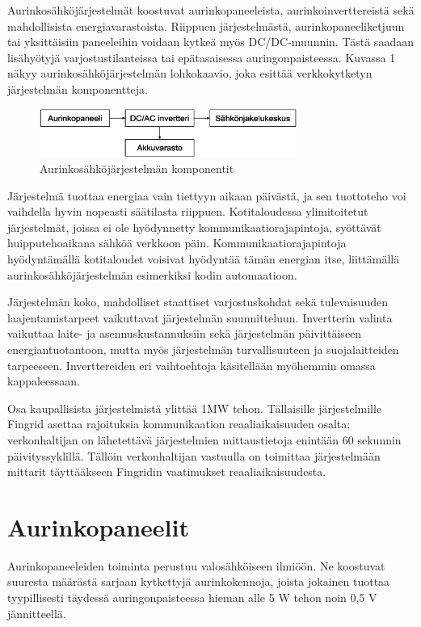 Aurinkosähköjärjestelmät koostuvat aurinkopaneeleista, aurinkoinverttereistä sekä mahdollisista energiavarastoista. Riippuen järjestelmästä, aurinkopaneeliketjuun tai yksittäisiin paneeleihin voidaan kytkeä myös DC/DC-muunnin. Tästä saadaan lisähyötyjä varjostustilanteissa tai epätasaisessa auringonpaisteessa.  Kuvassa 1 näkyy aurinkosähköjärjestelmän lohkokaavio, joka esittää verkkokytketyn järjestelmän komponentteja.
\begin{figure}
  \centering
  \includegraphics[width=0.75\textwidth]{figures/PV_system_components}
  \caption{Aurinkosähköjärjestelmän komponentit}
\end{figure}

Järjestelmä tuottaa energiaa vain tiettyyn aikaan päivästä, ja sen tuottoteho voi vaihdella hyvin nopeasti säätilasta riippuen. Kotitaloudessa ylimitoitetut järjestelmät, joissa ei ole hyödynnetty kommunikaatiorajapintoja, syöttävät huipputehoaikana sähköä verkkoon päin. Kommunikaatiorajapintoja hyödyntämällä kotitaloudet voisivat hyödyntää tämän energian itse, liittämällä aurinkosähköjärjestelmän esimerkiksi kodin automaatioon.

Järjestelmän koko, mahdolliset staattiset varjostuskohdat sekä tulevaisuuden laajentamistarpeet vaikuttavat järjestelmän suunnitteluun. Invertterin valinta vaikuttaa laite- ja asennuskustannuksiin sekä järjestelmän päivittäiseen energiantuotantoon, mutta myös järjestelmän turvallisuuteen ja suojalaitteiden tarpeeseen. Inverttereiden eri vaihtoehtoja käsitellään myöhemmin omassa kappaleessaan.

Osa kaupallisista järjestelmistä ylittää 1MW tehon. Tällaisille järjestelmille Fingrid asettaa rajoituksia kommunikaation reaaliaikaisuuden osalta; verkonhaltijan on lähetettävä järjestelmien mittaustietoja enintään 60 sekunnin päivityssyklillä. Tällöin verkonhaltijan vastuulla on toimittaa järjestelmään mittarit täyttääkseen Fingridin vaatimukset reaaliaikaisuudesta. \parencite{VJV2018}

\section{Aurinkopaneelit}
  Aurinkopaneeleiden toiminta perustuu valosähköiseen ilmiöön. Ne koostuvat suuresta määrästä sarjaan kytkettyjä aurinkokennoja, joista jokainen tuottaa tyypillisesti täydessä auringonpaisteessa hieman alle 5 W tehon noin 0,5 V jännitteellä. \parencite{Messenger}

